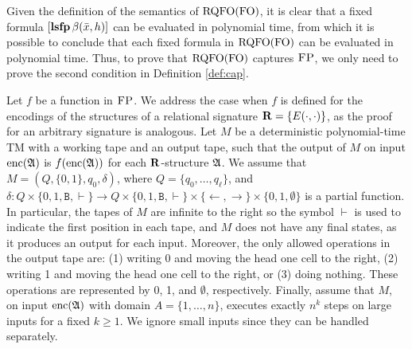 
\newcommand{\ttB}{\mathtt{B}}
\newcommand{\successor}{\text{succ}}
\newcommand{\out}{\text{\it out}}

Given the definition of the semantics of ${\rm RQFO}({\rm FO})$, it is clear that a fixed formula $[{\bf lsfp} \, \beta(\bar{x}, h)]$ can be evaluated in polynomial time, from which it is possible to conclude that each fixed formula in ${\rm RQFO}({\rm FO})$ can be evaluated in polynomial time. Thus, to prove that ${\rm RQFO}({\rm FO})$ captures $\text{\sc FP}$, we only need to prove the second condition in Definition \ref{def:cap}.

Let $f$ be a function in $\text{\sc FP}$. We address the case when $f$ is defined for the encodings of the structures of a relational signature $\mathbf{R} = \{ E(\cdot, \cdot) \}$, as the proof for an arbitrary signature is analogous.
 Let $M$ be a deterministic polynomial-time TM with a working tape and an output tape, such that the output of $M$ on input ${\rm enc}(\mathfrak{A})$ is $f({\rm enc}(\mathfrak{A}))$ for each $\mathbf{R}$-structure $\mathfrak{A}$. We assume that $M = (Q,\{0,1\},q_0,\delta)$, 
 where $Q = \{q_0,\ldots,q_{\ell}\}$, and $\delta:Q\times\{0,1,\ttB, \vdash\}\to Q\times\{0,1,\ttB, \vdash\}\times \{\leftarrow,\rightarrow\}\times\{0,1,\emptyset\}$ is a partial function. In particular, the tapes of $M$ are infinite to the right so the symbol $\vdash$ is used to indicate the first position in each tape, and $M$ does not have any final states, as it produces an output for each input. Moreover, the only allowed operations in the output tape are: 
 (1) writing 0 and moving the head one cell to the right, (2) writing 1 and moving the head one cell to the right, or (3) doing nothing. These operations are represented by 0, 1, and $\emptyset$, respectively. Finally, assume that $M$, on input ${\rm enc}(\mathfrak{A})$ with domain $A = \{1,\dots,n\}$, executes exactly $n^k$ steps on large inputs for a fixed $k \geq 1$. We ignore small inputs since they can be handled separately.

